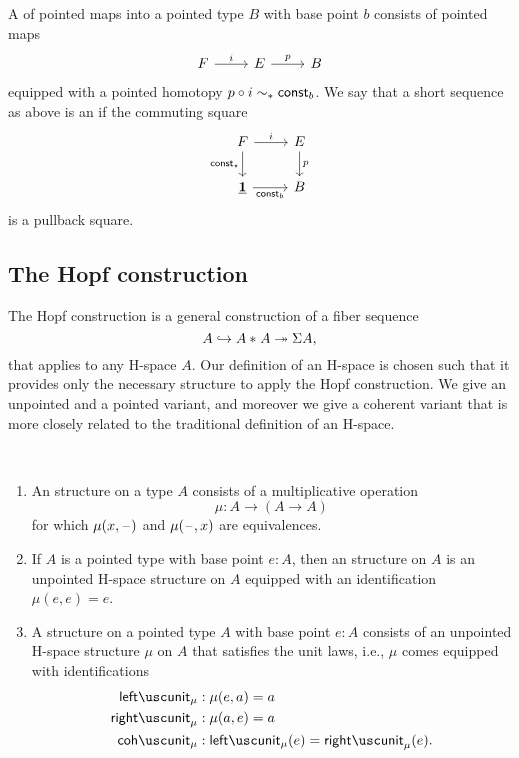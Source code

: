 \begin{defn}
  A  of pointed maps into a pointed type $B$ with base point $b$ consists of pointed maps
    \begin{equation*}
    \begin{tikzcd}
      F \arrow[r,"i"] & E \arrow[r,"p"] & B
    \end{tikzcd}
  \end{equation*}
  equipped with a pointed homotopy $p\circ i\sim_\ast \mathsf{const}_b$. We say that a short sequence as above is an  if the commuting square
  \begin{equation*}
    \begin{tikzcd}
      F \arrow[r,"i"] \arrow[d,swap,"\const_\star"] & E \arrow[d,"p"] \\
      \unit \arrow[r,swap,"\const_b"] & B
    \end{tikzcd}
  \end{equation*}
  is a pullback square.
\end{defn}

\subsection{The Hopf construction}

The Hopf construction is a general construction of a fiber sequence
\begin{equation*}
  A \hookrightarrow {A}\ast_{}{A}\twoheadrightarrow \Sigma A,
\end{equation*}
that applies to any H-space $A$. Our definition of an H-space is chosen such that it provides only the necessary structure to apply the Hopf construction. We give an unpointed and a pointed variant, and moreover we give a coherent variant that is more closely related to the traditional definition of an H-space.

\begin{defn}
  ~
  \begin{enumerate}
  \item An  structure on a type $A$ consists of a multiplicative operation
  \begin{equation*}
    \mu:A\to(A\to A)
  \end{equation*}
  for which $\mu(x,\mathord{\hspace{1pt}\text{--}\hspace{1pt}})$ and $\mu(\mathord{\hspace{1pt}\text{--}\hspace{1pt}},x)$ are equivalences.
  \item If $A$ is a pointed type with base point $e:A$, then an  structure on $A$ is an unpointed H-space structure on $A$ equipped with an identification $\mu(e,e)=e$.
  \item A  structure on a pointed type $A$ with base point $e:A$ consists of an unpointed H-space structure $\mu$ on $A$ that satisfies the unit laws, i.e., $\mu$ comes equipped with identifications
  \begin{align*}
    \leftunit_\mu & : \mu(e,a) = a \\
    \rightunit_\mu & : \mu(a,e) = a \\
    \cohunit_\mu & : \leftunit_\mu(e)=\rightunit_\mu(e).
  \end{align*}
  \end{enumerate}
\end{defn}

